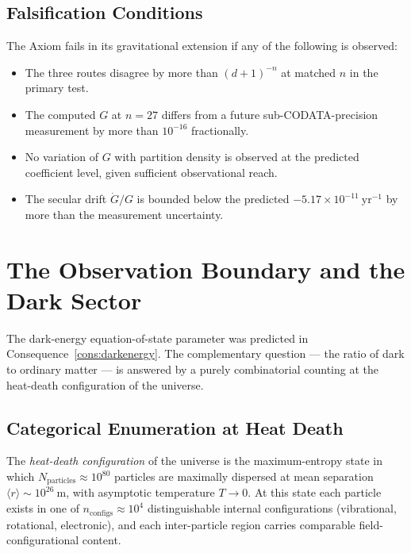 \subsection{Falsification Conditions}

The Axiom fails in its gravitational extension if any of the following is
observed:
\begin{itemize}[nosep]
\item The three routes disagree by more than $(d+1)^{-n}$ at matched $n$
  in the primary test.
\item The computed $G$ at $n = 27$ differs from a future sub-CODATA-precision
  measurement by more than $10^{-16}$ fractionally.
\item No variation of $G$ with partition density is observed at the predicted
  coefficient level, given sufficient observational reach.
\item The secular drift $\dot{G}/G$ is bounded below the predicted
  $-5.17\times10^{-11}~\mathrm{yr}^{-1}$ by more than the measurement uncertainty.
\end{itemize}

\section{The Observation Boundary and the Dark Sector}
\label{sec:ch20-darksector}
\label{sec:observationboundary}

The dark-energy equation-of-state parameter was predicted in
Consequence~\ref{cons:darkenergy}.
The complementary question --- the ratio of dark to ordinary matter --- is
answered by a purely combinatorial counting at the heat-death configuration
of the universe.

\subsection{Categorical Enumeration at Heat Death}

\begin{definition}\label{def:heatdeath}
The \emph{heat-death configuration} of the universe is the maximum-entropy
state in which $N_{\mathrm{particles}} \approx 10^{80}$ particles are
maximally dispersed at mean separation $\langle r\rangle \sim 10^{26}~\mathrm{m}$,
with asymptotic temperature $T \to 0$.
At this state each particle exists in one of
$n_{\mathrm{configs}} \approx 10^{4}$ distinguishable internal configurations
(vibrational, rotational, electronic), and each inter-particle region carries
comparable field-configurational content.
\end{definition}

